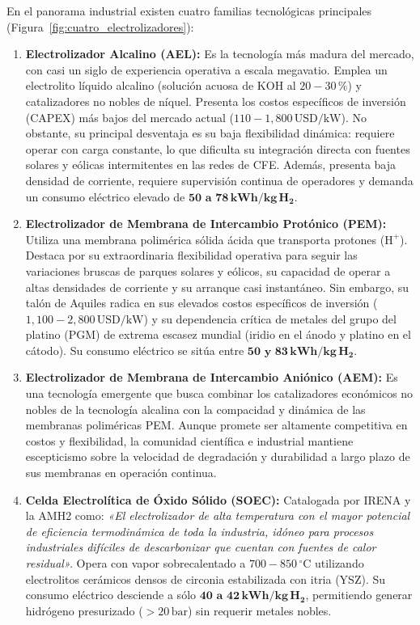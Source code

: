 \documentclass[11pt,a4paper]{article}
\begin{document}
En el panorama industrial existen cuatro familias tecnológicas principales (Figura~\ref{fig:cuatro_electrolizadores}):

\begin{enumerate}
    \item \textbf{Electrolizador Alcalino (AEL):}  
    Es la tecnología más madura del mercado, con casi un siglo de experiencia operativa a escala megavatio. Emplea un electrolito líquido alcalino (solución acuosa de $\text{KOH}$ al $20-30\,\%$) y catalizadores no nobles de níquel. Presenta los costos específicos de inversión (CAPEX) más bajos del mercado actual ($110 - 1{,}800\,\text{USD/kW}$). No obstante, su principal desventaja es su baja flexibilidad dinámica: requiere operar con carga constante, lo que dificulta su integración directa con fuentes solares y eólicas intermitentes en las redes de CFE. Además, presenta baja densidad de corriente, requiere supervisión continua de operadores y demanda un consumo eléctrico elevado de $\mathbf{50\text{ a }78\,\text{kWh/kg}\,\text{H}_2}$.

    \item \textbf{Electrolizador de Membrana de Intercambio Protónico (PEM):}  
    Utiliza una membrana polimérica sólida ácida que transporta protones ($\text{H}^+$). Destaca por su extraordinaria flexibilidad operativa para seguir las variaciones bruscas de parques solares y eólicos, su capacidad de operar a altas densidades de corriente y su arranque casi instantáneo. Sin embargo, su talón de Aquiles radica en sus elevados costos específicos de inversión ($1{,}100 - 2{,}800\,\text{USD/kW}$) y su dependencia crítica de metales del grupo del platino (PGM) de extrema escasez mundial (iridio en el ánodo y platino en el cátodo). Su consumo eléctrico se sitúa entre $\mathbf{50\text{ y }83\,\text{kWh/kg}\,\text{H}_2}$.

    \item \textbf{Electrolizador de Membrana de Intercambio Aniónico (AEM):}  
    Es una tecnología emergente que busca combinar los catalizadores económicos no nobles de la tecnología alcalina con la compacidad y dinámica de las membranas poliméricas PEM. Aunque promete ser altamente competitiva en costos y flexibilidad, la comunidad científica e industrial mantiene escepticismo sobre la velocidad de degradación y durabilidad a largo plazo de sus membranas en operación continua.

    \item \textbf{Celda Electrolítica de Óxido Sólido (SOEC):}  
    Catalogada por IRENA y la AMH2 como: \textit{«El electrolizador de alta temperatura con el mayor potencial de eficiencia termodinámica de toda la industria, idóneo para procesos industriales difíciles de descarbonizar que cuentan con fuentes de calor residual».} Opera con vapor sobrecalentado a $700 - 850\,^\circ\text{C}$ utilizando electrolitos cerámicos densos de circonia estabilizada con itria (YSZ). Su consumo eléctrico desciende a sólo $\mathbf{40\text{ a }42\,\text{kWh/kg}\,\text{H}_2}$, permitiendo generar hidrógeno presurizado ($>20\,\text{bar}$) sin requerir metales nobles.
\end{enumerate}
\end{document}
